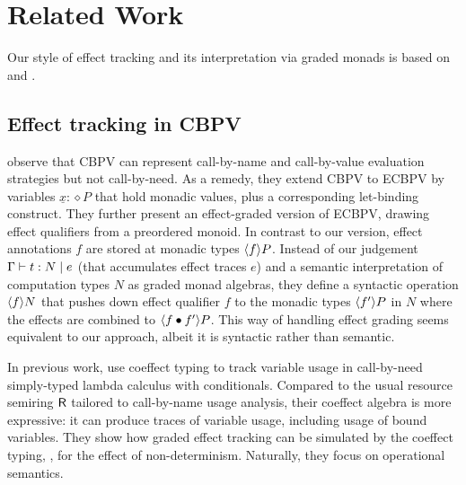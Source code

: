\documentclass[acmsmall,review,anonymous]{acmart}\settopmatter{printfolios=true,printccs=false,printacmref=false}
\theoremstyle{remark}
\begin{document}
\section{Related Work}

Our style of effect tracking and its interpretation via graded monads
is based on \citet{wadlerThiemann:tocl03} and \citet{katsumata:popl14}.

\subsection{Effect tracking in CBPV}

\citet{mcDermottMycroft:esop19} observe that CBPV can represent
call-by-name and call-by-value evaluation strategies but not
call-by-need.  As a remedy, they extend CBPV to ECBPV by variables
$\underline x : \diamond P$ that hold monadic values, plus a
corresponding let-binding construct.  They further present an
effect-graded version of ECBPV, drawing effect qualifiers from a
preordered monoid.  In contrast to our version, effect annotations
$f$ are stored at monadic types $\compty f P$.  Instead of our
judgement $\CompTy \Gamma t e N$ (that accumulates effect traces $e$)
and a semantic interpretation of computation types $N$ as graded monad
algebras, they define a syntactic operation $\compty f N$ that pushes
down effect qualifier $f$ to the monadic types $\compty {f'} P$ in $N$
where the effects are combined to $\compty{f \bu f'} P$.  This way of
handling effect grading seems equivalent to our approach, albeit it is
syntactic rather than semantic.

In previous work, \citet{mcDermottMycroft:ocs18} use coeffect typing
to track variable usage in call-by-need simply-typed lambda calculus
with conditionals.  Compared to the usual resource semiring $\R$
tailored to call-by-name usage analysis, their coeffect algebra is
more expressive: it can produce traces of variable usage, including
usage of bound variables.  They show how graded effect tracking can be
simulated by the coeffect typing, \eg, for the effect of
non-determinism.  Naturally, they focus on operational semantics.

\end{document}
